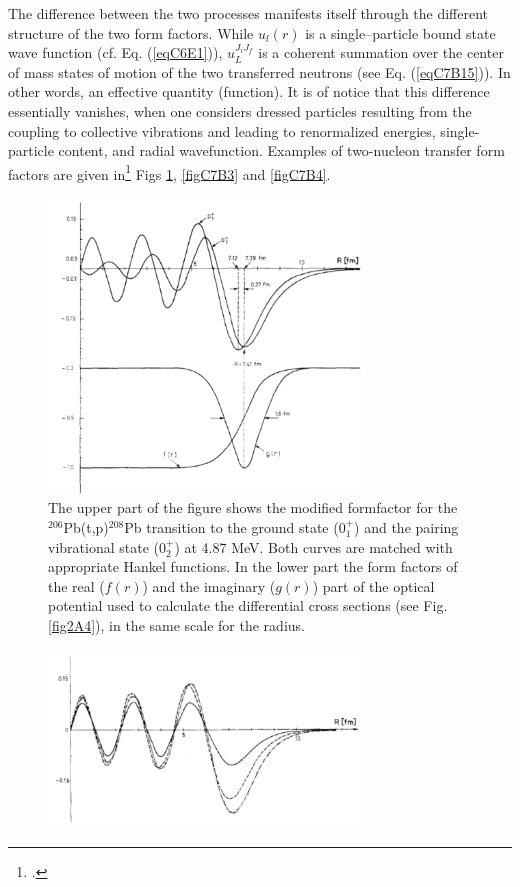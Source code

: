 \begin{subappendices}
The difference between the two processes manifests itself through the different structure of the two form factors. While $u_l(r)$  is a single--particle bound state wave function (cf. Eq. (\ref{eqC6E1})), $u_L^{J_i J_f}$ is a coherent summation over the center of mass states of motion of the two transferred neutrons (see Eq. (\ref{eqC7B15})). In other words, an effective quantity (function). It is of notice that this difference essentially vanishes, when one considers dressed particles resulting from the coupling to collective vibrations  and leading to renormalized energies, single-particle content, and radial wavefunction. Examples of two-nucleon transfer form factors are given in\footnote{\cite{Broglia:67}.} Figs \ref{figC7B2}, \ref{figC7B3} and \ref{figC7B4}.
 \begin{figure}[h!]
 	\begin{center}
\includegraphics*[width=0.75\textwidth]{C7/figs_C7/figC7B2}
\end{center}\caption{The upper part of the figure shows the modified formfactor for the $^{206}$Pb(t,p)$^{208}$Pb transition to the ground state ($0^+_1$) and the pairing vibrational state ($0^+_2$) at 4.87 MeV. Both curves are matched with appropriate 	Hankel functions. In the lower part the form factors of the real ($f(r)$) and the imaginary ($g(r)$) part of the optical potential used to calculate the differential cross sections (see Fig. \ref{fig2A4}),  in the same scale for the radius.}\label{figC7B2}
\end{figure}
 \begin{figure}[h!]
 	\begin{center}
\includegraphics*[width=0.75\textwidth]{C7/figs_C7/figC7B3}

\end{center}
\end{figure}
\end{subappendices}
